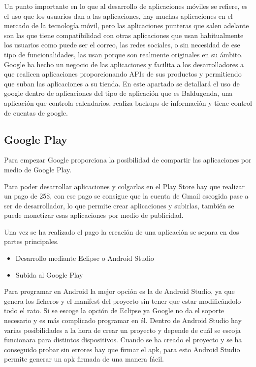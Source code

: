 Un punto importante en lo que al desarrollo de aplicaciones móviles se refiere, es el uso que los usuarios dan a las aplicaciones, hay muchas aplicaciones en el mercado de la tecnología móvil, pero las aplicaciones punteras que salen adelante son las que tiene compatibilidad con otras aplicaciones que usan habitualmente los usuarios como puede ser el correo, las redes sociales, o sin necesidad de ese tipo de funcionalidades, las usan porque son realmente originales en su ámbito.
Google ha hecho un negocio de las aplicaciones y facilita a los desarrolladores a que  realicen aplicaciones proporcionando APIs de sus productos y permitiendo que suban las aplicaciones a su tienda.
En este apartado se detallará el uso de google dentro de aplicaciones del tipo de aplicación que es Baldugenda, una aplicación que controla calendarios, realiza backups de información  y tiene control de cuentas de google.

\subsection{Google Play}
\label{subsecc:Google Play}

Para empezar Google proporciona la posibilidad de compartir  las aplicaciones por medio de Google Play.

Para poder desarrollar aplicaciones y colgarlas en el Play Store hay que realizar un pago de 25\$, con ese pago se consigue que la cuenta de Gmail escogida pase a ser de desarrollador, lo que permite crear aplicaciones y subirlas, también se puede monetizar esas aplicaciones por medio de publicidad.

Una vez se ha realizado el pago la creación de una aplicación se separa en dos partes principales.

\begin{itemize}
\item Desarrollo mediante Eclipse o Android Studio
\item Subida al Google Play
\end{itemize}

Para programar en Android la mejor opción es la de Android Studio, ya que genera los ficheros y el manifest del proyecto sin tener que estar modificándolo todo el rato.
Si se escoge la opción de Eclipse ya Google no da el soporte necesario y es más complicado programar en él.
Dentro de Android Studio hay varias posibilidades a la hora de crear un proyecto y depende de cuál se escoja funcionara para distintos dispositivos.
Cuando se ha creado el proyecto y se ha conseguido probar sin errores hay que firmar el apk, para esto Android Studio permite generar un apk firmada de una manera fácil.

